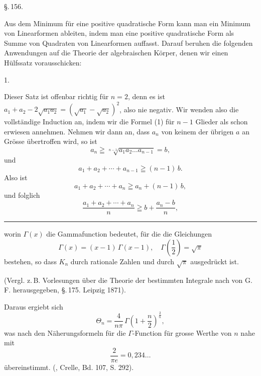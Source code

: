
\begin{center}
\S.\,156.

\end{center}

Aus dem Minimum f\"ur eine positive quadratische Form kann
man ein Minimum von Linearformen ableiten, indem man eine
positive quadratische Form als Summe von Quadraten von Linearformen
 auffasst. Darauf beruhen die folgenden Anwendungen
auf die Theorie der algebraischen K\"orper, denen wir einen H\"ulfssatz
 vorausschicken:

1. 

Dieser Satz ist offenbar richtig f\"ur $n=2$, denn es ist
$a_1 + a_2 - 2\sqrt{a_1 a_2} = (\sqrt{a_1} - \sqrt{a_2})^2$, also nie negativ. Wir
wenden also die vollst\"andige Induction an, indem wir die Formel
(1) f\"ur $n-1$ Glieder als schon erwiesen annehmen. Nehmen
wir dann an, dass $a_n$ von keinem der \"ubrigen $a$ an Gr\"osse \"ubertroffen
 wird, so ist
\[ a_n \geqq \sqrt[n-1]{a_1 a_2 \ldots a_{n-1}} = b, \]
und
\[ a_1 + a_2 + \cdots + a_{n-1} \geqq (n-1)\,b. \]
Also ist
\[ a_1 + a_2 + \cdots + a_n \geqq a_n + (n-1)\,b, \]
und folglich
\[ \frac{a_1 + a_2 + \cdots + a_n}{n} \geqq b + \frac{a_n - b}{n}, \]

\begin{footnotesize}
\noindent\rule{4cm}{0.4pt}

worin $\Gamma(x)$ die Gammafunction bedeutet, f\"ur die die Gleichungen
\[ \Gamma(x) = (x-1)\,\Gamma(x-1), \quad \Gamma\left(\frac{1}{2}\right) = \sqrt{\pi} \]
bestehen, so dass $K_n$ durch rationale Zahlen und durch $\sqrt{\pi}$ ausgedr\"uckt ist.

(Vergl. z.\,B. Vorlesungen \"uber die Theorie der bestimmten Integrale
nach  von G.\,F.  herausgegeben, \S.\,175.
Leipzig 1871).

Daraus ergiebt sich
\[ \Theta_n = \frac{4}{n\pi}\,\Gamma\left(1 + \frac{n}{2}\right)^{\frac{2}{n}}, \]
was nach den N\"aherungsformeln f\"ur die $\Gamma$-Function f\"ur grosse
Werthe von $n$ nahe mit
\[ \frac{2}{\pi e} = 0{,}234\ldots \]
\"ubereinstimmt. (, Crelle, Bd. 107, S. 292).
\end{footnotesize}
